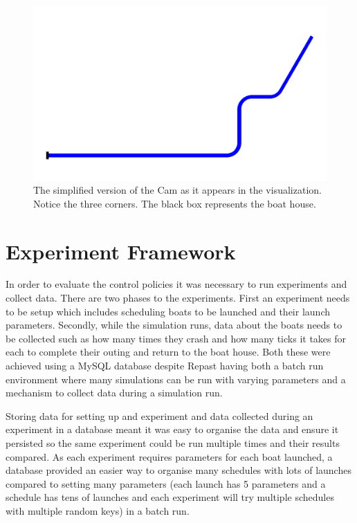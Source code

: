       \begin{figure}
      \begin{center}
        \includegraphics[scale=0.3]{images/SimplifiedCam.png}
        \caption{The simplified version of the Cam as it appears in the visualization. Notice the three corners. The black box represents the boat house.}
        \label{techissues:fig:simplecam}
      \end{center}
      \end{figure}
      
  \section{Experiment Framework}
  In order to evaluate the control policies it was necessary to run
  experiments and collect data. There are two phases to the
  experiments. First an experiment needs to be setup which includes
  scheduling boats to be launched and their launch
  parameters. Secondly, while the simulation runs, data about the boats needs to be collected such as how many times they crash and how many ticks it takes for each to complete their outing and return to the boat house. Both these were achieved using a MySQL database despite Repast having both a batch run environment where many simulations can be run with varying parameters and a mechanism to collect data during a simulation run. 
  
  Storing data for setting up and experiment and data collected during an experiment in a database meant it was easy to organise the data and ensure it persisted so the same experiment could be run multiple times and their results compared. As each experiment requires parameters for each boat launched, a database provided an easier way to organise many schedules with lots of launches compared to setting many parameters (each launch has 5 parameters and a schedule has tens of launches and each experiment will try multiple schedules with multiple random keys) in a batch run. 
  
